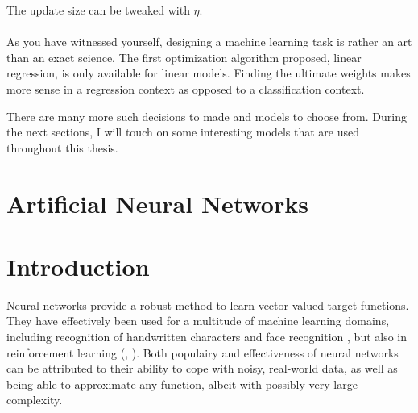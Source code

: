 The update size can be tweaked with $\eta$.

\paragraph{}
As you have witnessed yourself,
designing a machine learning task
is rather an art than an exact science.
The first optimization algorithm proposed,
linear regression,
is only available for linear models.
Finding the ultimate weights
makes more sense in a regression context
as opposed to a classification context.

There are many more such decisions to made
and models to choose from.
During the next sections,
I will touch on some interesting
models that are used throughout this thesis.


\section{Artificial Neural Networks}
\section{Introduction}
Neural networks provide a robust method to learn
vector-valued target functions.
They have effectively been used for a multitude of machine learning domains,
including recognition of handwritten characters
\cite{LeCun1989}
and
face recognition
\cite{Cottreil1991},
but also in reinforcement learning
(\cite{anderson1989}, \cite{lin1993}). %
Both populairy and effectiveness of neural networks can be attributed to
their ability to cope with noisy, real-world data,
as well as being able to approximate any function,
albeit with possibly very large complexity.
